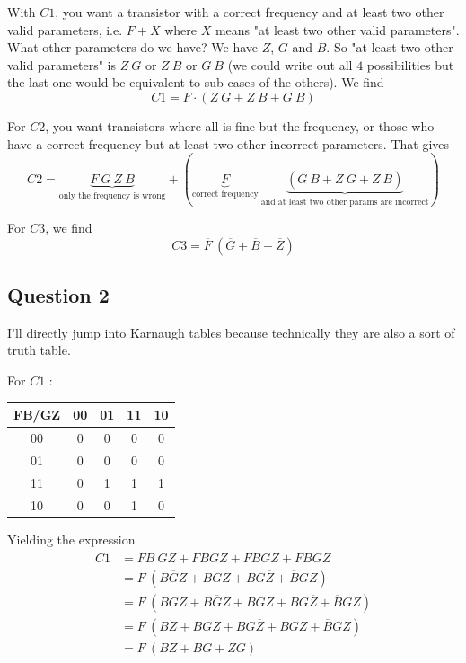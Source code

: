 \documentclass[a4paper,10pt]{article}
\begin{document}
With $C1$, you want a transistor with a correct frequency and at least two other valid parameters, i.e. $F+X$ where $X$ means "at least two other valid parameters". What other parameters do we have? We have $Z$, $G$ and $B$. So "at least two other valid parameters" is $Z~G$ or $Z~B$ or $G~B$ (we could write out all $4$ possibilities but the last one would be equivalent to sub-cases of the others). We find
$$C1=F\cdot\left(Z~G+Z~B+G~B\right)$$

For $C2$, you want transistors where all is fine but the frequency, or those who have a correct frequency but at least two other incorrect parameters. That gives
\[
C2=\underbrace{\overline{F}~G~Z~B}_{\text{only the frequency is wrong}}+\left(\underbrace{F}_{\text{correct frequency}}~\underbrace{\left(\overline{G}~\overline{B}+\overline{Z}~\overline{G}+\overline{Z}~\overline{B}\right)}_{\text{and at least two other params are incorrect}}\right)
\]

For $C3$, we find
\[
	C3=\overline{F}~\left(\overline{G}+\overline{B}+\overline{Z}\right)
\]

\subsection{Question 2}

I'll directly jump into Karnaugh tables because technically they are also a sort of truth table.

For $C1$ : 
\begin{center}
	\begin{tabular}{|c|c|c|c|c|}
		\hline
		FB/GZ&00&01&11&10\\\hline
		00&0&0&0&0\\\hline
		01&0&0&0&0\\\hline
		11&0&1&1&1\\\hline
		10&0&0&1&0\\\hline
	\end{tabular}
\end{center}
Yielding the expression
\begin{align*}
	C1&=FB~\overline{G}Z+FBGZ+FBG\overline{Z}+F\overline{B}GZ\\
	  &=F~\left(B\overline{G}Z+BGZ+BG\overline{Z}+\overline{B}GZ\right)\\
	  &=F~\left(BGZ+B\overline{G}Z+BGZ+BG\overline{Z}+\overline{B}GZ\right)\\
	  &=F~\left(BZ+BGZ+BG\overline{Z}+BGZ+\overline{B}GZ\right)\\
	  &=F~\left(BZ+BG+ZG\right)
\end{align*}
\end{document}
